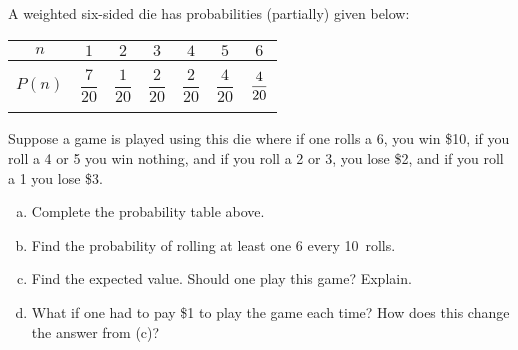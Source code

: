 \documentclass[11pt,letterpaper]{article}
\begin{document}
 A weighted six-sided die has probabilities (partially) given below: \par
	\begin{table}[!ht]
	\centering 
	\begin{tabular}{|c||c|c|c|c|c|c|} \hline 
	$n$ & $1$ & $2$ & $3$ & $4$ & $5$ & $6$ \\ \hline 
	$P(n)$ & $\dfrac{7}{20}$ & $\dfrac{1}{20}$ & $\dfrac{2}{20}$ & $\mathit{\dfrac{2}{20}}$ & $\dfrac{4}{20}$ & $\dfrac{4\rule{0pt}{2.9ex}}{20\rule[-1.3ex]{0pt}{0pt}}$ \\ \hline
	\end{tabular}
	\end{table} \par
Suppose a game is played using this die where if one rolls a 6, you win \$10, if you roll a 4 or 5 you win nothing, and if you roll a 2 or 3, you lose \$2, and if you roll a 1 you lose \$3. 
        \begin{enumerate}[(a)]
        \item Complete the probability table above.
        \item Find the probability of rolling at least one 6 every 10~rolls. 
        \item Find the expected value. Should one play this game? Explain.
        \item What if one had to pay \$1 to play the game each time? How does this change the answer from (c)? 
        \end{enumerate} \pspace
\end{document}
